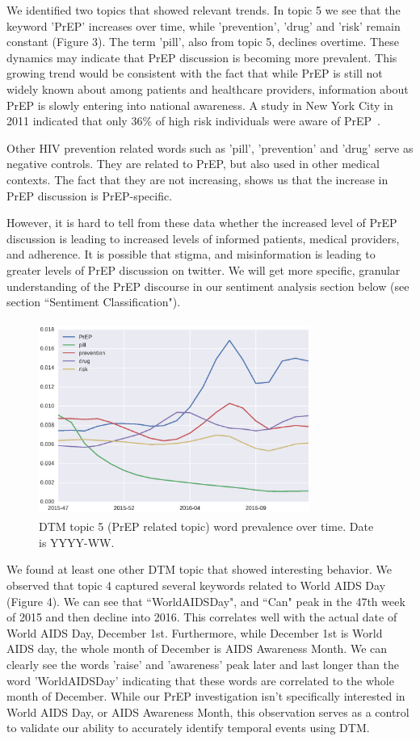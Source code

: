 \documentclass{sig-alternate-05-2015}
\begin{document}
We identified two topics that showed relevant trends. In topic 5 we see that the keyword 'PrEP' increases over time, while 'prevention', 'drug' and 'risk' remain constant (Figure 3). The term 'pill', also from topic 5, declines overtime. These dynamics may indicate that PrEP discussion is becoming more prevalent. This growing trend would be consistent with the fact that while PrEP is still not widely known about among patients and healthcare providers, information about PrEP is slowly entering into national awareness. A study in New York City in 2011 indicated that only 36\% of high risk individuals were aware of PrEP~\cite{mehta2011awareness}.

Other HIV prevention related words such as 'pill', 'prevention' and 'drug' serve as negative controls. They are related to PrEP, but also used in other medical contexts. The fact that they are not increasing, shows us that the increase in PrEP discussion is PrEP-specific.

However, it is hard to tell from these data whether the increased level of PrEP discussion is leading to increased levels of informed patients, medical providers, and adherence. It is possible that stigma, and misinformation is leading to greater levels of PrEP discussion on twitter. We will get more specific, granular understanding of the PrEP discourse in our sentiment analysis section below (see section ``Sentiment Classification").

\begin{figure}
\centering
\includegraphics[height=2.5in, width=3.5in]{DTMfig1}
\caption{DTM topic 5 (PrEP related topic) word prevalence over time. Date is YYYY-WW.}
\end{figure}

We found at least one other DTM topic that showed interesting behavior. We observed that topic 4 captured several keywords related to World AIDS Day (Figure 4). We can see that ``WorldAIDSDay", and ``Can" peak in the 47th week of 2015 and then decline into 2016. This correlates well with the actual date of World AIDS Day, December 1st. Furthermore, while December 1st is World AIDS day, the whole month of December is AIDS Awareness Month. We can clearly see the words 'raise' and 'awareness' peak later and last longer than the word 'WorldAIDSDay' indicating that these words are correlated to the whole month of December. While our PrEP investigation isn't specifically interested in World AIDS Day, or AIDS Awareness Month, this observation serves as a control to validate our ability to accurately identify temporal events using DTM. 
\end{document}
